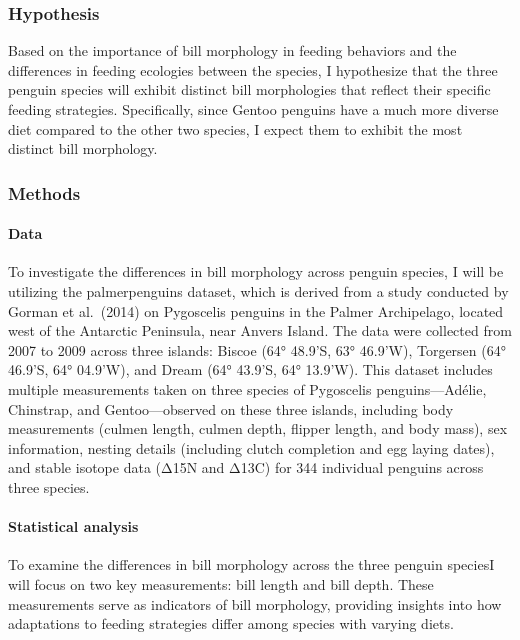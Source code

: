 \documentclass[
]{article}
\begin{document}
\subsubsection{Hypothesis}\label{hypothesis}

Based on the importance of bill morphology in feeding behaviors and the
differences in feeding ecologies between the species, I hypothesize that
the three penguin species will exhibit distinct bill morphologies that
reflect their specific feeding strategies. Specifically, since Gentoo
penguins have a much more diverse diet compared to the other two
species, I expect them to exhibit the most distinct bill morphology.

\subsubsection{Methods}\label{methods}

\paragraph{Data}\label{data}

To investigate the differences in bill morphology across penguin
species, I will be utilizing the palmerpenguins dataset, which is
derived from a study conducted by Gorman et al.~(2014) on Pygoscelis
penguins in the Palmer Archipelago, located west of the Antarctic
Peninsula, near Anvers Island. The data were collected from 2007 to 2009
across three islands: Biscoe (64° 48.9'S, 63° 46.9'W), Torgersen (64°
46.9'S, 64° 04.9'W), and Dream (64° 43.9'S, 64° 13.9'W). This dataset
includes multiple measurements taken on three species of Pygoscelis
penguins---Adélie, Chinstrap, and Gentoo---observed on these three
islands, including body measurements (culmen length, culmen depth,
flipper length, and body mass), sex information, nesting details
(including clutch completion and egg laying dates), and stable isotope
data (Δ15N and Δ13C) for 344 individual penguins across three species.

\paragraph{Statistical analysis}\label{statistical-analysis}

To examine the differences in bill morphology across the three penguin
speciesI will focus on two key measurements: bill length and bill depth.
These measurements serve as indicators of bill morphology, providing
insights into how adaptations to feeding strategies differ among species
with varying diets.
\end{document}
